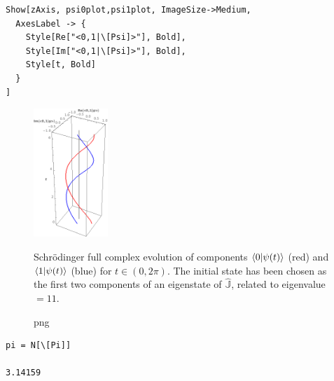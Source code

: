 \begin{Verbatim}
Show[zAxis, psi0plot,psi1plot, ImageSize->Medium,
  AxesLabel -> {
    Style[Re["<0,1|\[Psi]>"], Bold],
    Style[Im["<0,1|\[Psi]>"], Bold],
    Style[t, Bold]
  }
]
\end{Verbatim}
\begin{figure}[!h]
  \centering
  \includegraphics[width=0.25\textwidth]{img/qubit-evo-schrod.png}
  \caption[]{png}{
    Schr{\"o}dinger full complex evolution of components
    $\braket{0}{\psi(t)}$ (red) and
    $\braket{1}{\psi(t)}$ (blue) for
    $t \in (0, 2\pi) $. The initial state
    has been chosen as the first two components of an eigenstate of
    $\hat{\mathbb{J}}$, related to eigenvalue $= 11$.
  }
\end{figure}

\begin{Verbatim}
pi = N[\[Pi]]

3.14159
\end{Verbatim}

